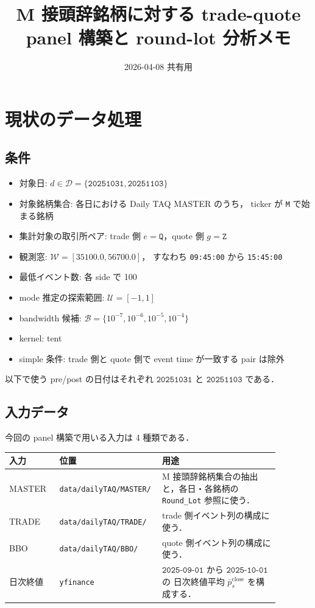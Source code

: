 \documentclass[a4paper,11pt]{jlreq}
\title{M 接頭辞銘柄に対する trade-quote panel 構築と round-lot 分析メモ}
\author{2026-04-08 共有用}
\date{}
\begin{document}
\maketitle

\section{現状のデータ処理}

\subsection{条件}

\begin{itemize}
  \item 対象日: \(d \in \mathcal{D}=\{\texttt{20251031}, \texttt{20251103}\}\)
  \item 対象銘柄集合: 各日における Daily TAQ MASTER のうち，
        ticker が \texttt{M} で始まる銘柄
  \item 集計対象の取引所ペア: trade 側 \(e=\texttt{Q}\)，quote 側 \(g=\texttt{Z}\)
  \item 観測窓: \(\mathcal{W}=[35100.0,56700.0]\)，
        すなわち \texttt{09:45:00} から \texttt{15:45:00}
  \item 最低イベント数: 各 side で 100
  \item mode 推定の探索範囲: \(\mathcal{U}=[-1,1]\)
  \item bandwidth 候補:
        \(\mathcal{B}=\{10^{-7},10^{-6},10^{-5},10^{-4}\}\)
  \item kernel: tent
  \item simple 条件: trade 側と quote 側で event time が一致する pair は除外
\end{itemize}

以下で使う pre/post の日付はそれぞれ
\(\texttt{20251031}\) と \(\texttt{20251103}\) である．

\subsection{入力データ}

今回の panel 構築で用いる入力は 4 種類である．

\begin{center}
\begin{tabular}{p{0.18\linewidth}p{0.28\linewidth}p{0.42\linewidth}}
\toprule
入力 & 位置 & 用途 \\
\midrule
MASTER &
\texttt{data/dailyTAQ/MASTER/} &
M 接頭辞銘柄集合の抽出と，各日・各銘柄の \texttt{Round\_Lot} 参照に使う． \\
TRADE &
\texttt{data/dailyTAQ/TRADE/} &
trade 側イベント列の構成に使う． \\
BBO &
\texttt{data/dailyTAQ/BBO/} &
quote 側イベント列の構成に使う． \\
日次終値 &
\texttt{yfinance} &
\(\texttt{2025-09-01}\) から \(\texttt{2025-10-01}\) の
日次終値平均 \(\bar{p}^{\mathrm{close}}_s\) を構成する． \\
\bottomrule
\end{tabular}
\end{center}
\end{document}
